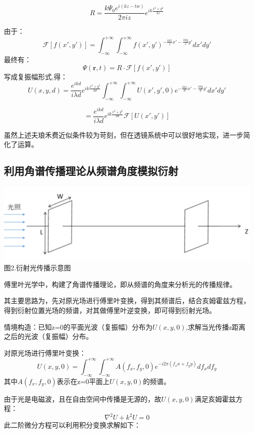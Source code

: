 \documentclass[a4paper,12pt]{article}
\begin{document}
$$
R=\frac{k\Psi_0e^{i(kz-tw)}}{2\pi iz}e^{ik\frac{x^2+y^2}{2z}}
$$

\noindent 由于：
$$
\mathcal F[f(x',y')]=\int_{-\infty}^{+\infty}\int_{-\infty}^{+\infty}f(x',y')^{-\frac{ikx}{z}x'-\frac{iky}{z}y'}dx'dy'
$$
最终有：
$$
\Psi(\pmb r,t)=R\cdot \mathcal F[f(x',y')]
$$
写成复振幅形式,得：
$$
U(x,y,d)=\frac{e^{ikd}}{i\lambda d}e^{ik\frac{x^2+y^2}{2d}}\int_{-\infty}^{+\infty}\int_{-\infty}^{+\infty}U(x',y',0)e^{-\frac{ikx}{d}x'-\frac{iky}{d}y'}dx'dy'
$$

$$
=\frac{e^{ikd}}{i\lambda d}e^{ik\frac{x^2+y^2}{2d}}\mathcal F[U(x',y')]
$$

\noindent 虽然上述夫琅禾费近似条件较为苛刻，但在透镜系统中可以很好地实现，进一步简化了运算。
	\newpage
		
	\subsection{利用角谱传播理论从频谱角度模拟衍射}
	\begin{center}
	\includegraphics[scale=0.4]{Pica4.png}\\
	图2.衍射光传播示意图
\end{center}\vspace{0.2cm}\par
		傅里叶光学中，构建了角谱传播理论，即从频谱的角度来分析光的传播规律。
		
		其主要思路为，先对原光场进行傅里叶变换，得到其频谱后，结合亥姆霍兹方程，得到衍射位置光场的频谱，对其做傅里叶逆变换，即可得到衍射光场。
		
		情境构造：已知z=0的平面光波（复振幅）分布为$U(x,y,0)$,求解当光传播z距离之后的光波（复振幅）分布。
		
		\noindent 对原光场进行傅里叶变换：
		$$
		U(x,y,0)=\int_{-\infty}^{+\infty}\int_{-\infty}^{+\infty}A(f_x,f_y,0)e^{-i2\pi (f_xx+f_yy)}df_xdf_y
		$$
		其中$A(f_x,f_y,0)$表示在z=0平面上$U(x,y,0)$的频谱。
		
		\noindent 由于光是电磁波，且在自由空间中传播是无源的，故$U(x,y,0)$满足亥姆霍兹方程：
		$$
		\nabla^2 U+k^2U=0
		$$
		此二阶微分方程可以利用积分变换求解如下：
		
\end{document}
